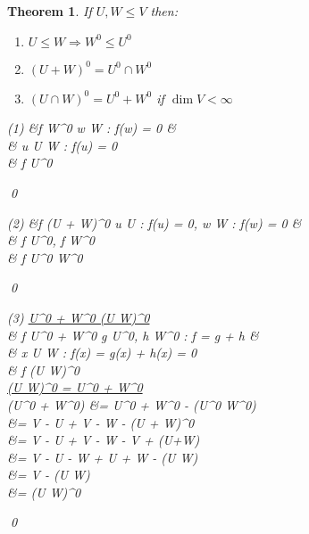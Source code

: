 \documentclass[11pt, a4paper]{report}
\makeatletter
\numberwithin{equation}{section}
\numberwithin{equation}{subsection}
\theoremstyle{plain}
\newtheorem{thm}{Theorem}[chapter] %
\theoremstyle{definition}
\theoremstyle{remark}
\newtheorem*{prf}{Proof}
\renewenvironment{prf}[1][\proofname]{\par
  \vspace{-\topsep}%
  \normalfont
  \topsep0pt \partopsep0pt %
  \trivlist
  \item[\hskip\labelsep
        \itshape
    #1\@addpunct{.}]\ignorespaces
}{%
  \popQED\endtrivlist\@endpefalse
  \addvspace{6pt plus 6pt} %
}
\newcommand{\pr}[1]{\begin{adjustwidth}{1cm}{} \begin{prf} #1 \end{prf} \end{adjustwidth}}
\makeatother
\begin{document}
\begin{thm}
If $U, W \leq V$ then:
\begin{enumerate}[(1) ]
\item $U \leq W \Longrightarrow W^0 \leq U^0$
\item $(U+W)^0 = U^0 \cap W^0$
\item $(U \cap W)^0 = U^0 + W^0$ if $\dim V < \infty$
\end{enumerate}

\pr{
\begin{flalign*}
(1) \hspace*{80pt} &f \in W^0 \iff \forall w \in W : f(w) = 0 &\\
			& \phantom{f \in W^0\,\;}\Longrightarrow \forall u \in U \leq W : f(u) = 0\\
			&\phantom{f \in W^0} \iff f \in U^0
\end{flalign*}\qed

\begin{flalign*}
(2) \hspace*{50pt} &f \in (U + W)^0 \iff \forall u \in U : f(u) = 0, \forall w \in W : f(w) = 0 &\\
 &\phantom{f \in (U + W)^0} \iff f \in U^0, f \in W^0\\
 &\phantom{f \in (U + W)^0} \iff f \in U^0 \cap W^0
\end{flalign*}\qed

\begin{flalign*}
(3) \hspace*{10pt} \underline{U^0 + W^0 \leq (U \cap W)^0}\\
& f \in U^0 + W^0 \iff \exists g \in U^0, \exists h \in W^0 : f = g + h &\\
& \phantom{f \in U + W \;\,} \Longrightarrow \forall x \in U \cap W : f(x) = g(x) + h(x) = 0\\
& \phantom{f \in U + W} \iff f \in (U \cap W)^0\\
\phantom{(3) \hspace*{10pt}} \underline{(U \cap W)^0 = U^0 + W^0}\\
 \dim(U^0 + W^0) &= \dim U^0 + \dim W^0 - \dim (U^0 \cap W^0)\\
 	&= \dim V - \dim U + \dim V - \dim W - \dim(U + W)^0\\
 	&= \dim V - \dim U + \dim V - \dim W - \dim V + \dim (U+W)\\
 	&= \dim V - \dim U - \dim W + \dim U + \dim W - \dim(U \cap W)\\
 	&= \dim V - \dim (U \cap W)\\
 	&= \dim (U \cap W)^0
\end{flalign*}\qed
}
\end{thm}
\end{document}
